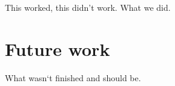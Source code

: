 \documentclass[12pt,a4paper]{report}
\let\openright=\clearpage
\begin{document}
This worked, this didn't work. What we did.

\chapter*{Future work}

What wasn`t finished and should be.




\listoffigures

\listoftables


\printacronyms[include-classes=abbrev,heading=none] %




\openright
\end{document}
